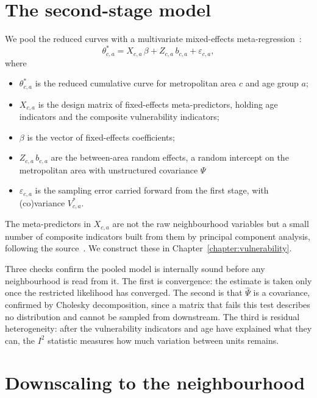\section{The second-stage model}
 
We pool the reduced curves with a multivariate mixed-effects meta-regression~\citep{sera2019}:
%
\begin{equation}\label{eq_secondstage}
\theta^{*}_{c,a} = X_{c,a}\,\beta + Z_{c,a}\,b_{c,a} + \varepsilon_{c,a},
\end{equation}
%
where
\begin{itemize}
  \item $\theta^{*}_{c,a}$ is the reduced cumulative curve for metropolitan area $c$ and age group $a$;
  \item $X_{c,a}$ is the design matrix of fixed-effects meta-predictors, holding age indicators and the composite vulnerability indicators;
  \item $\beta$ is the vector of fixed-effects coefficients;
  \item $Z_{c,a}\,b_{c,a}$ are the between-area random effects, a random intercept on the metropolitan area with unstructured covariance $\Psi$~\citep{sera2019mixmeta}
  \item $\varepsilon_{c,a}$ is the sampling error carried forward from the first stage, with (co)variance $V^{*}_{c,a}$.
\end{itemize}
 
The meta-predictors in $X_{c,a}$ are not the raw neighbourhood variables but a small number of composite indicators built from them by principal component analysis, following the source~\citep{gasparrini2022smallarea}. We construct these in Chapter~\ref{chapter:vulnerability}.

Three checks confirm the pooled model is internally sound before any neighbourhood is read from it. The first is convergence: the estimate is taken only once the restricted likelihood has converged. The second is that $\hat{\Psi}$ is a covariance, confirmed by Cholesky decomposition, since a matrix that fails this test describes no distribution and cannot be sampled from downstream. The third is residual heterogeneity: after the vulnerability indicators and age have explained what they can, the $I^{2}$ statistic measures how much variation between units remains.
 
\section{Downscaling to the neighbourhood}
 
